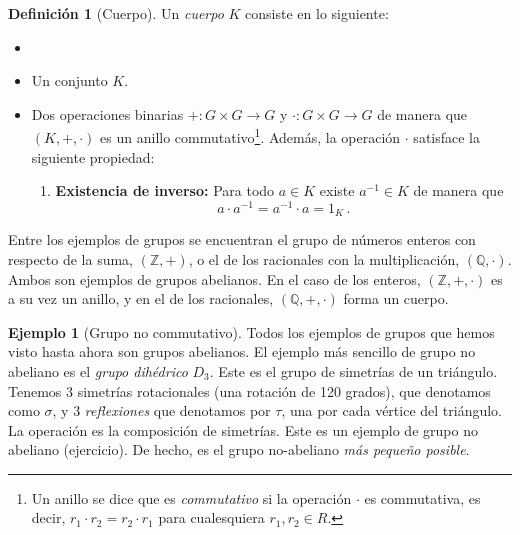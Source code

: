 \documentclass[a4paper,11pt]{amsart}
\theoremstyle{plain}
\theoremstyle{definition}
\newtheorem{defi}[thm]{Definición}
\newtheorem{ej}[thm]{Ejemplo}
\theoremstyle{remark}
\begin{document}
\begin{defi}[Cuerpo]
 Un \textit{cuerpo} $K$ consiste en lo siguiente:
    \begin{itemize}
        \item \item Un conjunto $K$.
        \item Dos operaciones binarias $+ \colon G \times G \to G$ y $\cdot \colon G \times G \to G$ de manera que $(K, + , \cdot)$ es un anillo commutativo\footnote{Un anillo se dice que es \textit{commutativo} si la operación $\cdot$ es commutativa, es decir, $r_1 \cdot r_2 = r_2 \cdot r_1$ para cualesquiera $r_1, r_2 \in R$.}. Además, la operación $\cdot$ satisface la siguiente propiedad: 
\begin{enumerate}[label = \roman*)]
    \item \textbf{Existencia de inverso:} Para todo $a \in K$ existe $a^{-1} \in K$ de manera que 
    \[ a \cdot a^{-1} = a^{-1} \cdot a = 1_K \, .\]
\end{enumerate}
    \end{itemize}
\end{defi}

Entre los ejemplos de grupos se encuentran el grupo de números enteros con respecto de la suma, $(\mathbb{Z}, +)$, o el de los racionales con la multiplicación, $(\mathbb{Q}, \cdot)$. Ambos son ejemplos de grupos abelianos. En el caso de los enteros, $(\mathbb{Z}, +, \cdot)$ es a su vez un anillo, y en el de los racionales, $(\mathbb{Q}, +, \cdot)$ forma un cuerpo.

\begin{ej}[Grupo no commutativo]
Todos los ejemplos de grupos que hemos visto hasta ahora son grupos abelianos. El ejemplo más sencillo de grupo no abeliano es el  \textit{grupo dihédrico} $D_3$. Este es el grupo de simetrías de un triángulo. Tenemos $3$ simetrías rotacionales (una rotación de 120 grados), que denotamos como $\sigma$, y $3$ \textit{reflexiones} que denotamos por $\tau$, una por cada vértice del triángulo. La operación es la composición de simetrías. Este es un ejemplo de grupo no abeliano (ejercicio). De hecho, es el grupo no-abeliano \textit{más pequeño posible}.
\end{ej}
\end{document}
